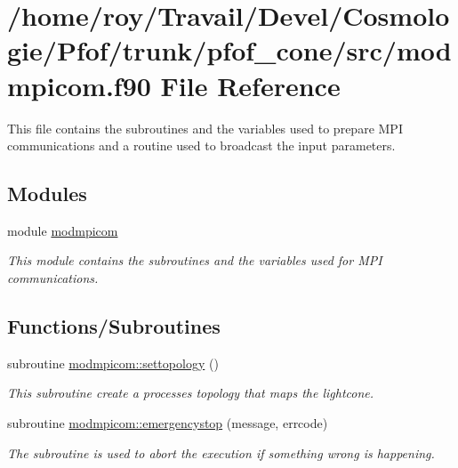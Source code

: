 \hypertarget{pfof__cone_2src_2modmpicom_8f90}{}\section{/home/roy/\+Travail/\+Devel/\+Cosmologie/\+Pfof/trunk/pfof\+\_\+cone/src/modmpicom.f90 File Reference}
\label{pfof__cone_2src_2modmpicom_8f90}


This file contains the subroutines and the variables used to prepare M\+PI communications and a routine used to broadcast the input parameters.  


\subsection*{Modules}
\begin{DoxyCompactItemize}
\item 
module \hyperlink{namespacemodmpicom}{modmpicom}
\begin{DoxyCompactList}\small\item\em This module contains the subroutines and the variables used for M\+PI communications. \end{DoxyCompactList}\end{DoxyCompactItemize}
\subsection*{Functions/\+Subroutines}
\begin{DoxyCompactItemize}
\item 
subroutine \hyperlink{namespacemodmpicom_a158a13b594a854025da3c47f32a493de}{modmpicom\+::settopology} ()
\begin{DoxyCompactList}\small\item\em This subroutine create a processes topology that maps the lightcone. \end{DoxyCompactList}\item 
subroutine \hyperlink{namespacemodmpicom_a75a2de7a16fce78b94bd79731a2fbd81}{modmpicom\+::emergencystop} (message, errcode)
\begin{DoxyCompactList}\small\item\em The subroutine is used to abort the execution if something wrong is happening. \end{DoxyCompactList}\end{DoxyCompactItemize}
